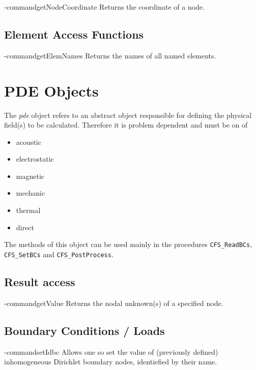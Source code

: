 \tcl-command{getNodeCoordinate}
Returns the coordinate of a node.
\begin{tcl-params}
  \paramlist
  \returnlist
\end{tcl-params}


\subsection{Element Access Functions}

\tcl-command{getElemNames}
Returns the names of all named elements.
\begin{tcl-params}
  \returnlist
\end{tcl-params}



 
\section{PDE Objects}
The {\em pde} object refers to an abstract object responsible for
defining the physical field(s) to be calculated. Therefore it is
problem dependent and must be on of
\begin{itemize}
\item acoustic
\item electrostatic
\item magnetic
\item mechanic
\item thermal
\item direct
\end{itemize}
The methods of this object can be used mainly in the procedures
\verb#CFS_ReadBCs#, \verb#CFS_SetBCs# and \verb#CFS_PostProcess#.

\subsection{Result access}

\tcl-command{getValue}
Returns the nodal unknown(s) of a specified node.
\begin{tcl-params}
  \paramlist
  \returnlist
\end{tcl-params}

\subsection{Boundary Conditions / Loads}

\tcl-command{setIdbc}
Allows one so set the value of (previously defined) inhomogeneous
Dirichlet boundary nodes, identiefied by their name.
\begin{tcl-params}
  \paramlist
\end{tcl-params}

